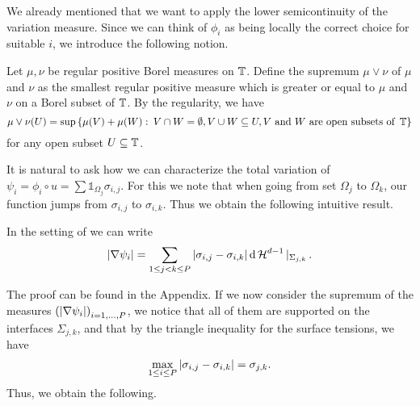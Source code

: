 We already mentioned that we want to apply the lower semicontinuity of the variation measure. Since we can think of $ \phi_{ i } $ as being locally the correct choice for suitable $ i $, we introduce the following notion.

\begin{definition}
	Let $ \mu , \nu $ be regular positive Borel measures on $ \operatorname{\mathbb{T}} $. Define the supremum $ \mu \vee \nu $ of $ \mu $ and $ \nu $ as the smallest regular positive measure which is greater or equal to $ \mu $ and $ \nu $ on a Borel subset of $ \operatorname{\mathbb{T}} $. By the regularity, we have
	\begin{equation*}
		\mu \vee \nu ( U ) 
		=
		\sup \left\{
			\mu ( V ) + \mu ( W )
			\, \colon \,
			V \cap W = \emptyset,
			V \cup W \subseteq U, 
			V \text{ and } W \text{ are open subsets of } \operatorname{\mathbb{T}}
		\right\}
	\end{equation*}
	for any open subset $ U \subseteq \operatorname{\mathbb{T}} $.
\end{definition}

It is natural to ask how we can characterize the total variation of $ \psi_{ i } = \phi_{ i } \circ u = \sum \mathds{ 1 }_{ \Omega_{ j } } \sigma_{ i , j } $. For this we note that when going from set $ \Omega_{ j } $ to $ \Omega_{ k } $, our function jumps from $ \sigma_{ i , j } $ to $ \sigma_{ i , k } $. Thus we obtain the following intuitive result.

\begin{lemma}
	\label{rewriting_variation_of_psi_i}
	In the setting of  we can write
	\begin{equation*}
		\abs{ \nabla \psi_{ i } }
		=
		\sum_{ 1 \leq j < k \leq P }
			\abs{ \sigma_{ i , j } - \sigma_{ i , k } }
			\dd{ \operatorname{\mathcal{H}}^{ d - 1 } |_{ \Sigma_{ j , k } } }.
	\end{equation*}
\end{lemma}

The proof can be found in the Appendix. If we now consider the supremum of the measures $ \left( \abs{ \nabla \psi_{ i } } \right)_{ i = 1 , \dotsc, P } $, we notice that all of them are supported on the interfaces $ \Sigma_{ j , k } $, and that by the triangle inequality for the surface tensions, we have 
\begin{equation}
	\label{maximum_of_differences_of_surface_tensions}
	\max_{ 1 \leq i \leq P }
		\abs{ \sigma_{ i , j } - \sigma_{ i , k } }
	=
	\sigma_{ j , k }.
\end{equation}
Thus, we obtain the following.

